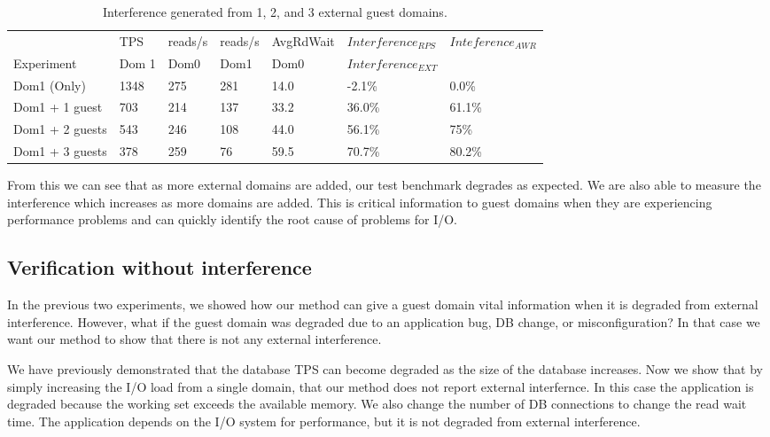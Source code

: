 \begin{table}[!h]
\begin{tabular}{ l l l l l l p{9cm} }
                   & TPS   & reads/s & reads/s & AvgRdWait & $Interference_{RPS}$ & $Inteference_{AWR}$ \\
	Experiment     & Dom 1 & Dom0     & Dom1     & Dom0      & $Interference_{EXT}$ &             \\
	\hline
    Dom1 (Only)     & 1348 & 275      & 281      & 14.0     &  -2.1\%  &   0.0\%   \\
    Dom1 + 1 guest  &  703 & 214      & 137      & 33.2     &  36.0\%  &   61.1\%  \\
    Dom1 + 2 guests &  543 & 246      & 108      & 44.0      &  56.1\%  &   75\%    \\
    Dom1 + 3 guests &  378 & 259      &  76      & 59.5    &  70.7\%  &   80.2\%  \\
\end{tabular}
\caption{Interference generated from 1, 2, and 3 external guest domains.}
\label{tab:domains}
\end{table}

From this we can see that as more external domains are added, our test benchmark degrades as expected.  We are also able to measure the interference which increases as more domains are added.  This is critical information to guest domains when they are experiencing performance problems and can quickly identify the root cause of problems for I/O.

\subsection{Verification without interference}
In the previous two experiments, we showed how our method can give a guest domain vital information when it is degraded from external interference.  However, what if the guest domain was degraded due to an application bug, DB change, or misconfiguration?   In that case we want our method to show that there is not any external interference.

We have previously demonstrated that the database TPS can become degraded as the size of the database increases.  Now we show that by simply increasing the I/O load from a single domain, that our method does not report external interfernce. In this case the application is degraded because the working set exceeds the available memory. We also change the number of DB connections to change the read wait time.  The application depends on the I/O system for performance, but it is not degraded from external interference.


